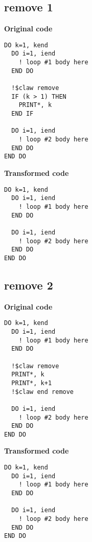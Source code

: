 \documentclass{article}
\begin{document}
\subsection{remove 1}
\label{remove1}

\textbf{Original code}
\begin{lstlisting}
DO k=1, kend
  DO i=1, iend
    ! loop #1 body here
  END DO

  !$claw remove
  IF (k > 1) THEN
    PRINT*, k
  END IF

  DO i=1, iend
    ! loop #2 body here
  END DO
END DO
\end{lstlisting}

\textbf{Transformed code}
\begin{lstlisting}
DO k=1, kend
  DO i=1, iend
    ! loop #1 body here
  END DO

  DO i=1, iend
    ! loop #2 body here
  END DO
END DO
\end{lstlisting}




\subsection{remove 2}
\label{remove2}

\textbf{Original code}
\begin{lstlisting}
DO k=1, kend
  DO i=1, iend
    ! loop #1 body here
  END DO

  !$claw remove
  PRINT*, k
  PRINT*, k+1
  !$claw end remove

  DO i=1, iend
    ! loop #2 body here
  END DO
END DO
\end{lstlisting}


\textbf{Transformed code}
\begin{lstlisting}
DO k=1, kend
  DO i=1, iend
    ! loop #1 body here
  END DO

  DO i=1, iend
    ! loop #2 body here
  END DO
END DO
\end{lstlisting}
\end{document}

